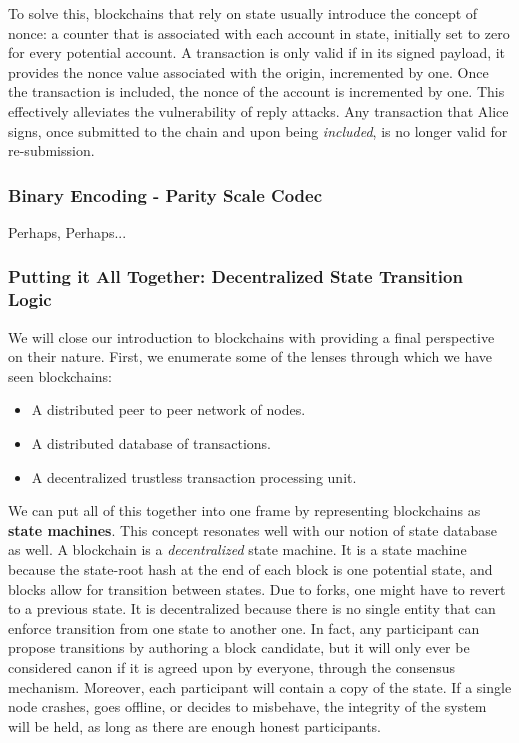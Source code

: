 To solve this, blockchains that rely on state usually introduce the concept of nonce: a counter that
is associated with each account in state, initially set to zero for every potential account. A
transaction is only valid if in its signed payload, it provides the nonce value associated with the
origin, incremented by one. Once the transaction is included, the nonce of the account is
incremented by one. This effectively alleviates the vulnerability of reply attacks. Any transaction
that Alice signs, once submitted to the chain and upon being \textit{included}, is no longer valid
for re-submission.

\subsubsection{Binary Encoding - Parity Scale Codec}

Perhaps, Perhaps...

\subsubsection{Putting it All Together: Decentralized State Transition Logic} \label{chap_bg:subsec:decentralized_state_machine}

We will close our introduction to blockchains with providing a final perspective on their nature.
First, we enumerate some of the lenses through which we have seen blockchains:

\begin{itemize}
	\item A distributed peer to peer network of nodes.
	\item A distributed database of transactions.
	\item A decentralized trustless transaction processing unit.
\end{itemize}

We can put all of this together into one frame by representing blockchains as \textbf{state
machines}. This concept resonates well with our notion of state database as well. A blockchain is a
\textit{decentralized} state machine. It is a state machine because the state-root hash at the end of
each block is one potential state, and blocks allow for transition between states. Due to forks, one
might have to revert to a previous state. It is decentralized because there is no single entity that
can enforce transition from one state to another one. In fact, any participant can propose
transitions by authoring a block candidate, but it will only ever be considered canon if it is
agreed upon by everyone, through the consensus mechanism. Moreover, each participant will contain a copy of
the state. If a single node crashes, goes offline, or decides to misbehave, the integrity of the
system will be held, as long as there are enough honest participants.

